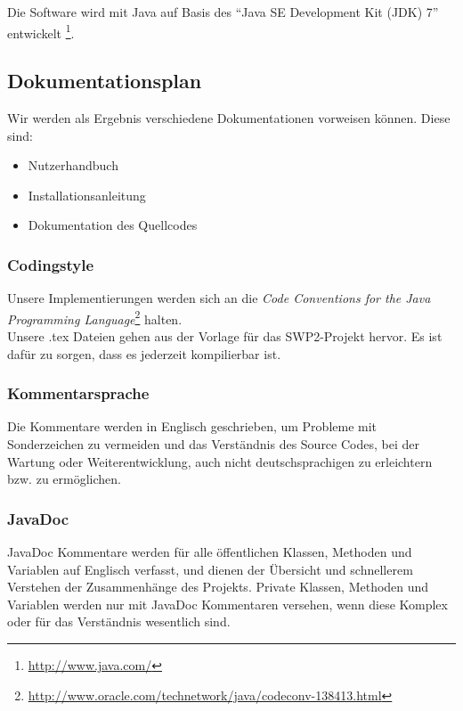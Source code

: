 \documentclass[fontsize=12pt,paper=a4,twoside]{scrartcl}
\begin{document}
Die Software wird mit Java auf Basis des "`Java SE Development Kit (JDK) 7"' entwickelt \footnote{\url{http://www.java.com/}}.\\

\subsection{Dokumentationsplan}
Wir werden als Ergebnis verschiedene Dokumentationen vorweisen können. Diese sind:

\begin{itemize}
\item{Nutzerhandbuch}
\item{Installationsanleitung}
\item{Dokumentation des Quellcodes}
\end{itemize}

\subsubsection{Codingstyle}
Unsere Implementierungen werden sich an die \emph{Code Conventions for the Java Programming Language}\footnote{\url{http://www.oracle.com/technetwork/java/codeconv-138413.html}} halten.\\
Unsere .tex Dateien gehen aus der Vorlage für das SWP2-Projekt hervor. Es ist dafür zu sorgen, dass es jederzeit kompilierbar ist.


\subsubsection{Kommentarsprache}

Die Kommentare werden in Englisch geschrieben, um Probleme mit Sonderzeichen zu vermeiden und das Verständnis des Source Codes, bei der Wartung oder Weiterentwicklung, auch nicht deutschsprachigen zu erleichtern bzw. zu ermöglichen.

\subsubsection{JavaDoc}

JavaDoc Kommentare werden für alle öffentlichen Klassen, Methoden und Variablen auf Englisch verfasst, und dienen der Übersicht und schnellerem Verstehen der Zusammenhänge des Projekts.
Private Klassen, Methoden und Variablen werden nur mit JavaDoc Kommentaren versehen, wenn diese Komplex oder für das Verständnis wesentlich sind.
\end{document}
